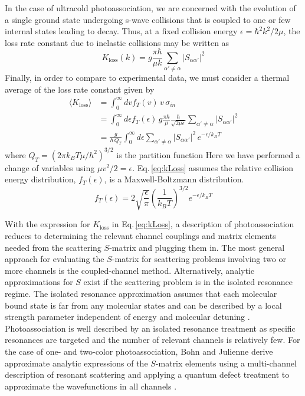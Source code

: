In the case of ultracold photoassociation, we are concerned with the evolution of a single ground state undergoing s-wave collisions that is coupled to one or few internal states leading to decay.
Thus, at a fixed collision energy $\epsilon = \hbar^2 k^2 / 2\mu$, the loss rate constant due to inelastic collisions may be written as 
\begin{equation}
	K_{\text{loss}}(k) = g \frac{\pi \hbar}{\mu k} \sum_{\alpha' \neq \alpha}\vert S_{\alpha \alpha'} \vert^2
\end{equation}
Finally, in order to compare to experimental data, we must consider a thermal average of the loss rate constant given by \cite{Julienne2009, Julienne2014, Krems2009b}
\begin{align} \label{eq:kLoss}
  \langle K_{\text{loss}} \rangle &= \int_0^{\infty} dv f_T(v)\,v\,\sigma_{in} \\
                                  &= \int_0^{\infty} d\epsilon  f_T(\epsilon)\, g \frac{\pi \hbar}{\mu} \frac{\hbar}{\sqrt{2 \mu \epsilon}} \sum_{\alpha' \neq \alpha}\vert S_{\alpha \alpha'} \vert^2 \\
                                  &= \frac{g}{h\,Q_{T}} \int_{0}^{\infty} d\epsilon \sum_{\alpha' \neq \alpha}\vert S_{\alpha \alpha'} \vert^2 \,e^{-\epsilon/k_{B}T}
\end{align}
where $Q_T=(2 \pi k_B T \mu/h^2)^{3/2}$ is the partition function
Here we have performed a change of variables using $\mu v^2/2=\epsilon$.
Eq.\,\ref{eq:kLoss} assumes the relative collision energy distribution, $f_T(\epsilon)$, is a Maxwell-Boltzmann distribution.
\begin{equation}
	f_T(\epsilon) = 2 \sqrt{\frac{\epsilon}{\pi}} \left( \frac{1}{k_B T} \right)^{3/2} e^{-\epsilon/k_B T}
\end{equation}

With the expression for $K_{\text{loss}}$ in Eq.\,\ref{eq:kLoss}, a description of photoassociation reduces to determining the relevant channel couplings and matrix elements needed from the scattering $S$-matrix and plugging them in.
The most general approach for evaluating the $S$-matrix for scattering problems involving two or more channels is the coupled-channel method.
Alternatively, analytic approximations for $S$ exist if the scattering problem is in the isolated resonance regime.
The isolated resonance approximation assumes that each molecular bound state is far from any molecular states and can be described by a local strength parameter independent of energy and molecular detuning \cite{Nicholson2015a}.
Photoassociation is well described by an isolated resonance treatment as specific resonances are targeted and the number of relevant channels is relatively few.
For the case of one- and two-color photoassociation, Bohn and Julienne derive approximate analytic expressions of the $S$-matrix elements using a multi-channel description of resonant scattering and applying a quantum defect treatment to approximate the wavefunctions in all channels \cite{Bohn1999, Bohn1996, Julienne2006}.

